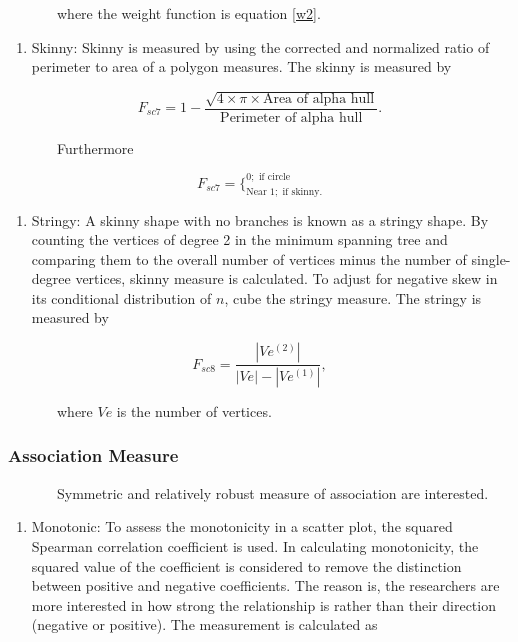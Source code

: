 \documentclass{article}
\begin{document}
~~~~~~~where the weight function is equation \ref{w2}.

\begin{enumerate}
\def\labelenumi{\roman{enumi})}
\setcounter{enumi}{1}
\tightlist
\item
  Skinny: Skinny is measured by using the corrected and normalized ratio
  of perimeter to area of a polygon measures. The skinny is measured by
\end{enumerate}

\begin{equation}
    F_{sc7} = 1- \frac{\sqrt{4 \times \pi \times \text{Area of alpha hull}}}{\text{Perimeter of alpha hull}}.
\end{equation}

~~~~~~~Furthermore

\[F_{sc7} = \Bigg\{^{0; \text{ if circle}}_{\text{Near } 1 ; \text{ if skinny}.}\]

\begin{enumerate}
\def\labelenumi{\roman{enumi})}
\setcounter{enumi}{2}
\tightlist
\item
  Stringy: A skinny shape with no branches is known as a stringy shape.
  By counting the vertices of degree 2 in the minimum spanning tree and
  comparing them to the overall number of vertices minus the number of
  single-degree vertices, skinny measure is calculated. To adjust for
  negative skew in its conditional distribution of \(n\), cube the
  stringy measure. The stringy is measured by
\end{enumerate}

\begin{equation}
    F_{sc8} = \frac{|Ve^{(2)}|}{|Ve| - |Ve^{(1)}|},
\end{equation}

~~~~~~~where \(Ve\) is the number of vertices.

\hypertarget{association-measure}{%
\subsubsection{Association Measure}\label{association-measure}}

~~~~~~~Symmetric and relatively robust measure of association are
interested.

\begin{enumerate}
\def\labelenumi{\roman{enumi})}
\tightlist
\item
  Monotonic: To assess the monotonicity in a scatter plot, the squared
  Spearman correlation coefficient is used. In calculating monotonicity,
  the squared value of the coefficient is considered to remove the
  distinction between positive and negative coefficients. The reason is,
  the researchers are more interested in how strong the relationship is
  rather than their direction (negative or positive). The measurement is
  calculated as
\end{enumerate}
\end{document}
